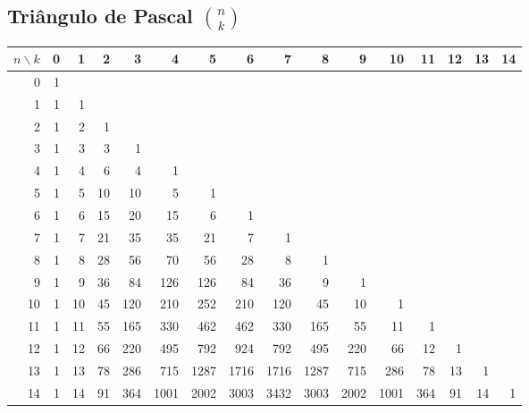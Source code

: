 \subsection{Triângulo de Pascal $\binom{n}{k}$}

{\fontsize{6}{7}\selectfont
\setlength{\tabcolsep}{2pt}
\noindent\begin{tabular}{r|rrrrrrrrrrrrrrr}
$n\backslash k$ & 0 & 1 & 2 & 3 & 4 & 5 & 6 & 7 & 8 & 9 & 10 & 11 & 12 & 13 & 14 \\
\hline
0  & 1 \\
1  & 1 & 1 \\
2  & 1 & 2 & 1 \\
3  & 1 & 3 & 3 & 1 \\
4  & 1 & 4 & 6 & 4 & 1 \\
5  & 1 & 5 & 10 & 10 & 5 & 1 \\
6  & 1 & 6 & 15 & 20 & 15 & 6 & 1 \\
7  & 1 & 7 & 21 & 35 & 35 & 21 & 7 & 1 \\
8  & 1 & 8 & 28 & 56 & 70 & 56 & 28 & 8 & 1 \\
9  & 1 & 9 & 36 & 84 & 126 & 126 & 84 & 36 & 9 & 1 \\
10 & 1 & 10 & 45 & 120 & 210 & 252 & 210 & 120 & 45 & 10 & 1 \\
11 & 1 & 11 & 55 & 165 & 330 & 462 & 462 & 330 & 165 & 55 & 11 & 1 \\
12 & 1 & 12 & 66 & 220 & 495 & 792 & 924 & 792 & 495 & 220 & 66 & 12 & 1 \\
13 & 1 & 13 & 78 & 286 & 715 & 1287 & 1716 & 1716 & 1287 & 715 & 286 & 78 & 13 & 1 \\
14 & 1 & 14 & 91 & 364 & 1001 & 2002 & 3003 & 3432 & 3003 & 2002 & 1001 & 364 & 91 & 14 & 1 \\
\end{tabular}
}
